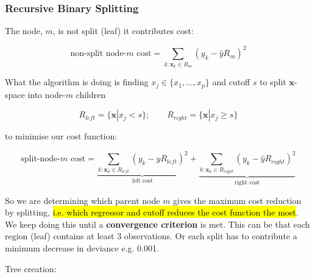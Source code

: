 \documentclass[11pt]{article}
\begin{document}
\subsubsection{Recursive Binary Splitting}

The node, $m$, is not split (leaf) it contributes cost:

\begin{equation*}
    \text{non-split node-}m \text{ cost} = \sum_{k:\mathbf{x}_k\in R_m}(y_k - \hat{y}R_m)^2
\end{equation*}

What the algorithm is doing is finding $x_j \in \{x_1, \ldots, x_p\}$ and cutoff $s$ to split $\mathbf{x}$-space into node-$m$ children

\begin{equation*}
    R_{left} = \{\mathbf{x}|x_j<s\}; \qquad R_{right} = \{\mathbf{x}|x_j \geq s\}
\end{equation*}

to minimise our cost function:

\begin{equation*}
    \text{split-node-}m \text{ cost} = \underbrace{\sum_{k:\mathbf{x}_k\in R_{left}}(y_k - \hat{y}R_{left})^2}_{\text{left cost}} + \underbrace{\sum_{k:\mathbf{x}_k\in R_{right}}(y_k - \hat{y}R_{right})^2}_{\text{right cost}}
\end{equation*}

So we are determining which parent node $m$ gives the maximum cost reduction by splitting, \hl{i.e. which regressor and cutoff reduces the cost function the most}. We keep doing this until a \textbf{convergence criterion} is met. This can be that each region (leaf) contains at least 3 observations. Or each split has to contribute a minimum decrease in deviance e.g. 0.001.


    
\begin{algo}

Tree creation:

\begin{center}

\end{center}
    
\end{algo}
\end{document}
